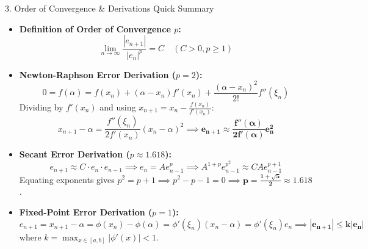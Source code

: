 \documentclass[11pt,a4paper]{article}
\begin{document}
\newpage

\begin{exbox}{3. Order of Convergence \& Derivations Quick Summary}
\begin{itemize}
    \item \textbf{Definition of Order of Convergence $p$:}
    \begin{equation*}
        \lim_{n \to \infty} \frac{|e_{n+1}|}{|e_n|^p} = C \quad (C > 0, p \ge 1)
    \end{equation*}
    \item \textbf{Newton-Raphson Error Derivation ($p=2$):}
    \begin{equation*}
        0 = f(\alpha) = f(x_n) + (\alpha - x_n)f'(x_n) + \frac{(\alpha - x_n)^2}{2!}f''(\xi_n)
    \end{equation*}
    Dividing by $f'(x_n)$ and using $x_{n+1} = x_n - \frac{f(x_n)}{f'(x_n)}$:
    \begin{equation*}
        x_{n+1} - \alpha = \frac{f''(\xi_n)}{2f'(x_n)}(x_n - \alpha)^2 \implies \mathbf{e_{n+1} \approx \frac{f''(\alpha)}{2f'(\alpha)} e_n^2}
    \end{equation*}
    \item \textbf{Secant Error Derivation ($p \approx 1.618$):}
    \begin{equation*}
        e_{n+1} \approx C \cdot e_n \cdot e_{n-1} \implies e_n = A e_{n-1}^p \implies A^{1+p} e_{n-1}^{p^2} \approx C A e_{n-1}^{p+1}
    \end{equation*}
    Equating exponents gives $p^2 = p + 1 \implies p^2 - p - 1 = 0 \implies \mathbf{p = \frac{1 + \sqrt{5}}{2} \approx 1.618}$.
    \item \textbf{Fixed-Point Error Derivation ($p=1$):}
    \begin{equation*}
        e_{n+1} = x_{n+1} - \alpha = \phi(x_n) - \phi(\alpha) = \phi'(\xi_n)(x_n - \alpha) = \phi'(\xi_n) e_n \implies \mathbf{|e_{n+1}| \le k |e_n|}
    \end{equation*}
    where $k = \max_{x \in [a, b]} |\phi'(x)| < 1$.
\end{itemize}
\end{exbox}
\end{document}
